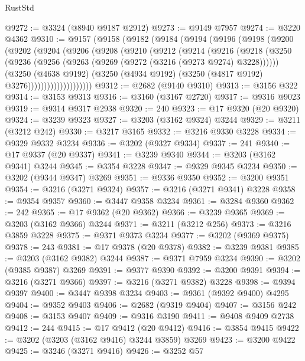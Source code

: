 \begin{lexlean}{RustStd}
\begin{coremodule}
@9272 := @3324 (@8940 @9187 @2912)
@9273 := @9149 @7957
@9274 := @3220 @4362
@9310 := @9157
    (@9158
      (@9182
        (@9184
          (@9194
            (@9196
              (@9198
                (@9200
                  (@9202
                    (@9204
                      (@9206
                        (@9208
                          (@9210
                            (@9212
                              (@9214
                                (@9216
                                  (@9218
                                    (@3250
                                      (@9236
                                        (@9256 (@9263 (@9269 (@9272 (@3216 (@9273 @9274) @3228))))))
                                      (@3250
                                        (@4638 @9192)
                                        (@3250
                                          (@4934 @9192)
                                          (@3250 (@4817 @9192) @3276))))))))))))))))))))
@9312 := @2682 (@9140 @9310)
@9313 := @3156 @322
@9314 := @3153 @9313
@9316 := @3160 (@3167 @2720)
@9317 := @9316 @9023
@9319 := @9314 @9317 @2938
@9320 := 240
@9323 := @17 @9320 (@20 @9320)
@9324 := @3239 @9323
@9327 := @3203 (@3162 @9324) @3244
@9329 := @3211 (@3212 @242)
@9330 := @3217 @3165
@9332 := @3216 @9330 @3228
@9334 := @9329 @9332 @3234
@9336 := @3202 (@9327 @9334)
@9337 := 241
@9340 := @17 @9337 (@20 @9337)
@9341 := @3239 @9340
@9344 := @3203 (@3162 @9341) @3244
@9345 := @3354 @3228
@9347 := @9329 @9345 @3234
@9350 := @3202 (@9344 @9347) @3269
@9351 := @9336 @9350
@9352 := @3200 @9351
@9354 := @3216 (@3271 @9324)
@9357 := @3216 (@3271 @9341) @3228
@9358 := @9354 @9357
@9360 := @3447 @9358 @3234
@9361 := @3284 @9360
@9362 := 242
@9365 := @17 @9362 (@20 @9362)
@9366 := @3239 @9365
@9369 := @3203 (@3162 @9366) @3244
@9371 := @3211 (@3212 @256)
@9373 := @3216 @3859 @3228
@9375 := @9371 @9373 @3234
@9377 := @3202 (@9369 @9375)
@9378 := 243
@9381 := @17 @9378 (@20 @9378)
@9382 := @3239 @9381
@9385 := @3203 (@3162 @9382) @3244
@9387 := @9371 @7959 @3234
@9390 := @3202 (@9385 @9387) @3269
@9391 := @9377 @9390
@9392 := @3200 @9391
@9394 := @3216 (@3271 @9366)
@9397 := @3216 (@3271 @9382) @3228
@9398 := @9394 @9397
@9400 := @3447 @9398 @3234
@9403 := @9361 (@9392 @9400) @4295
@9404 := @9352 @9403
@9406 := @2682 (@9319 @9404)
@9407 := @3156 @242
@9408 := @3153 @9407
@9409 := @9316 @3190
@9411 := @9408 @9409 @2738
@9412 := 244
@9415 := @17 @9412 (@20 @9412)
@9416 := @3854 @9415
@9422 := @3202 (@3203 (@3162 @9416) @3244 @3859) @3269
@9423 := @3200 @9422
@9425 := @3246 (@3271 @9416)
@9426 := @3252 @57

\end{coremodule}
\end{lexlean}
